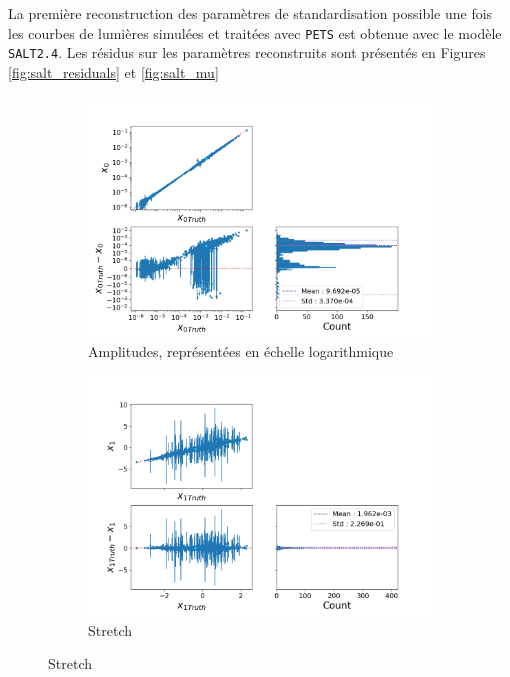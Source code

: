 \documentclass{book}
\def\pets{\texttt{PETS}\xspace}
\def\saltd{\texttt{SALT2.4}\xspace}
\begin{document}
La première reconstruction des paramètres de standardisation possible une fois les courbes de lumières simulées et traitées avec \pets est obtenue avec le modèle \saltd. Les résidus sur les paramètres reconstruits sont présentés en Figures \ref{fig:salt_residuals} et \ref{fig:salt_mu}

\begin{figure}[h]
	\centering
	\begin{subfigure}{0.45\textwidth}
		\centering
		\includegraphics[width=\textwidth]{figures/salt_x0.png}
		\caption{Amplitudes, représentées en échelle logarithmique}
		\label{fig:salt_x0}
	\end{subfigure}
	\hfill
	\begin{subfigure}{0.45\textwidth}
		\centering
		\includegraphics[width=\textwidth]{figures/salt_x1.png}
		\caption{Stretch}

\end{subfigure}
\end{figure}
\end{document}
